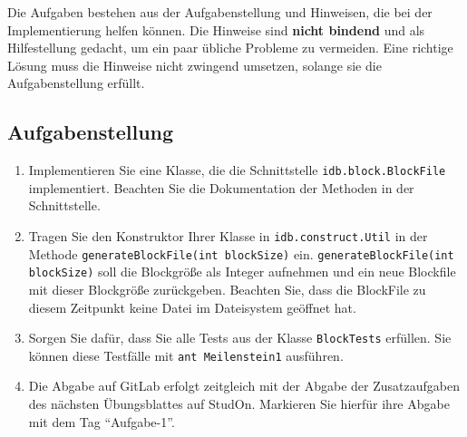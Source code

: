Die Aufgaben bestehen aus der Aufgabenstellung und Hinweisen, die bei der Implementierung helfen können.
Die Hinweise sind \textbf{nicht bindend} und als Hilfestellung gedacht, um ein paar übliche Probleme zu vermeiden.
Eine richtige Lösung muss die Hinweise nicht zwingend umsetzen, solange sie die Aufgabenstellung erfüllt.

\subsection{Aufgabenstellung}
\begin{enumerate}
	\item Implementieren Sie eine Klasse, die die Schnittstelle \beamertxt{\linebreak}\texttt{idb.block.BlockFile} implementiert.
		Beachten Sie die Dokumentation der Methoden in der Schnittstelle.
	\item Tragen Sie den Konstruktor Ihrer Klasse in \texttt{idb.construct.Util} in der Methode \texttt{generateBlockFile(int blockSize)} ein.
		\texttt{generateBlockFile(int blockSize)} soll die Blockgröße als Integer aufnehmen und ein neue Blockfile mit dieser Blockgröße zurückgeben.
		Beachten Sie, dass die BlockFile zu diesem Zeitpunkt keine Datei im Dateisystem geöffnet hat.
	\item Sorgen Sie dafür, dass Sie alle Tests aus der Klasse \texttt{BlockTests} erfüllen.
	Sie können diese Testfälle mit \lstinline|ant Meilenstein1| ausführen.
	\item Die Abgabe auf GitLab erfolgt zeitgleich mit der Abgabe der Zusatzaufgaben des nächsten Übungsblattes auf StudOn. Markieren Sie hierfür ihre Abgabe mit dem Tag "`Aufgabe-1"'.
\end{enumerate}

